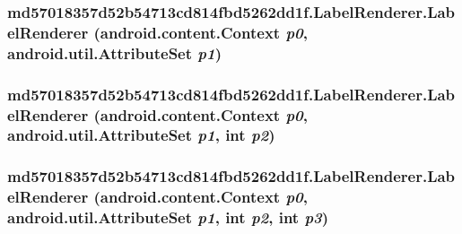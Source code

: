 \hypertarget{classmd57018357d52b54713cd814fbd5262dd1f_1_1_label_renderer_daa775bc61d4d4d62b052709e7420a74}{
\subsubsection[{LabelRenderer}]{\setlength{\rightskip}{0pt plus 5cm}md57018357d52b54713cd814fbd5262dd1f.LabelRenderer.LabelRenderer (android.content.Context {\em p0}, \/  android.util.AttributeSet {\em p1})}}
\label{classmd57018357d52b54713cd814fbd5262dd1f_1_1_label_renderer_daa775bc61d4d4d62b052709e7420a74}


\hypertarget{classmd57018357d52b54713cd814fbd5262dd1f_1_1_label_renderer_ca7fb08e1f26103c255dfaa50e9f0a16}{
\subsubsection[{LabelRenderer}]{\setlength{\rightskip}{0pt plus 5cm}md57018357d52b54713cd814fbd5262dd1f.LabelRenderer.LabelRenderer (android.content.Context {\em p0}, \/  android.util.AttributeSet {\em p1}, \/  int {\em p2})}}
\label{classmd57018357d52b54713cd814fbd5262dd1f_1_1_label_renderer_ca7fb08e1f26103c255dfaa50e9f0a16}


\hypertarget{classmd57018357d52b54713cd814fbd5262dd1f_1_1_label_renderer_6f9455e9a2f672bf746a3fa1819652aa}{
\subsubsection[{LabelRenderer}]{\setlength{\rightskip}{0pt plus 5cm}md57018357d52b54713cd814fbd5262dd1f.LabelRenderer.LabelRenderer (android.content.Context {\em p0}, \/  android.util.AttributeSet {\em p1}, \/  int {\em p2}, \/  int {\em p3})}}
\label{classmd57018357d52b54713cd814fbd5262dd1f_1_1_label_renderer_6f9455e9a2f672bf746a3fa1819652aa}




